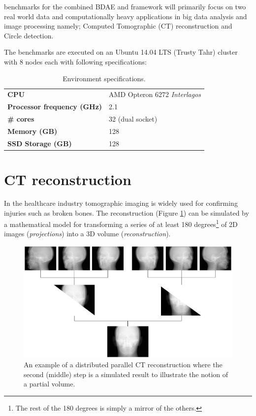  benchmarks for the combined BDAE and \CodeName framework will primarily focus on two real world data and computationally heavy applications in big data analysis and image processing namely; Computed Tomographic (CT) reconstruction and Circle detection.
\newline

The benchmarks are executed on an Ubuntu 14.04 LTS (Trusty Tahr)\cite{PageUbuntu1404} cluster with 8 nodes each with following specifications:
\vspace*{5mm}
\begin{table}[h!]
	\centering
	\begin{tabular}{l l}
		\textbf{CPU} & AMD Opteron 6272 \emph{Interlagos} \\
		\textbf{Processor frequency (GHz)} & 2.1 \\
		\textbf{\# cores} & 32 (dual socket) \\
		\textbf{Memory (GB)} & 128 \\
		\textbf{SSD Storage (GB)} & 128 
	\end{tabular}
	\caption{Environment specifications.\label{tab:specifications}}
\end{table}

\section{CT reconstruction}
In the healthcare industry tomographic imaging is widely used for confirming injuries such as broken bones. The reconstruction (Figure \ref{fig:ct}) can be simulated by a mathematical model for transforming a series of at least 180 degrees\footnote{The rest of the 180 degrees is simply a mirror of the others.} of 2D images (\textit{projections}) into a 3D volume (\textit{reconstruction}).
\newpage

\begin{figure}
	\vspace*{3mm}
	\centering
	\includegraphics[scale=0.25]{pdf/CT.pdf}
	\caption[]{An example of a distributed parallel CT reconstruction where the second (middle) step is a simulated result to illustrate the notion of a partial volume. \label{fig:ct}}
	\vspace*{3mm}
\end{figure}

